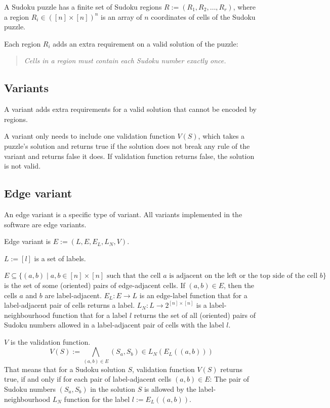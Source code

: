 A Sudoku puzzle has a finite set of Sudoku regions $R := (R_1, R_2, \dots, R_r)$,
where a region $R_i \in ([n] \times [n])^n$ is an array of $n$ coordinates of cells of the Sudoku puzzle.

Each region $R_i$ adds an extra requirement on a valid solution of the puzzle:
\begin{quote}
    \textit{
        Cells in a region must contain each Sudoku number exactly once.
    }
\end{quote}


\subsection*{Variants}

A variant adds extra requirements for a valid solution that cannot be encoded by regions.

A variant only needs to include one validation function $V(S)$,
which takes a puzzle's solution and returns true if the solution does not break any rule of the variant
and returns false it does.
If validation function returns false, the solution is not valid.

\subsection*{Edge variant}

An edge variant is a specific type of variant.
All variants implemented in the software are edge variants.

Edge variant is $E := (L, E, E_L, L_N, V)$.

$L := [l]$
is a set of labels.

$E \subseteq \{(a, b) \mid a, b \in [n] \times [n]
\text{ such that the cell } a \text{ is adjacent on the left or the top side of the cell } b\}$
is the set of some (oriented) pairs of edge-adjacent cells.
If $(a, b) \in E$, then the cells $a$ and $b$ are label-adjacent.
$E_L : E \to L$
is an edge-label function that for a label-adjacent pair of cells returns a label.
$L_N : L \to 2^{[n] \times [n]}$
is a label-neighbourhood function that for a label $l$ returns
the set of all (oriented) pairs of Sudoku numbers allowed in a
label-adjacent pair of cells with the label $l$.

$V$ is the validation function.
\[
    V(S) := \bigwedge_{(a, b) \in E} (S_a, S_b) \in L_N(E_L((a, b)))
\]
That means that for a Sudoku solution $S$, validation function $V(S)$ returns true,
if and only if for each pair of label-adjacent cells $(a, b) \in E$:
The pair of Sudoku numbers $(S_a, S_b)$ in the solution $S$ is allowed by the label-neighbourhood $L_N$ function
for the label $l := E_L((a, b))$.
